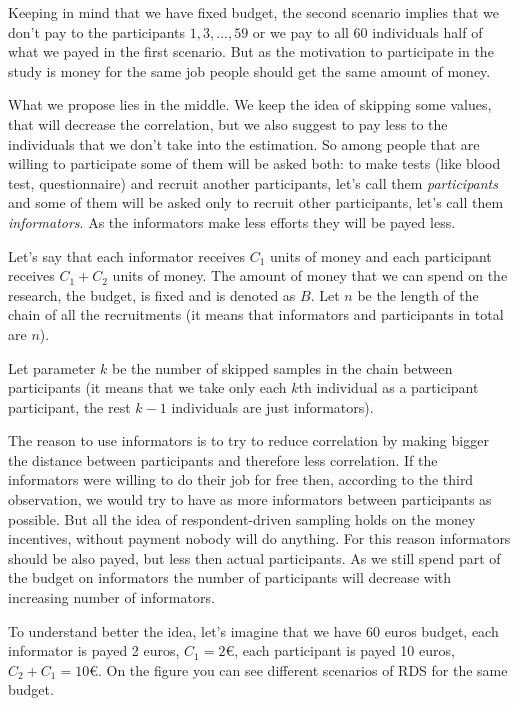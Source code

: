 \documentclass[12pt]{report}
\begin{document}
Keeping in mind that we have fixed budget, the second scenario implies that we don't pay to the participants $1, 3, ..., 59$ or we pay to all 60 individuals half of what we payed in the first scenario. But as the motivation to participate in the study is money for the same job people should get the same amount of money.

What we propose lies in the middle. We keep the idea of skipping some values, that will decrease the correlation, but we also suggest to pay less to the individuals that we don't take into the estimation. 
So among people that are willing to participate some of them will be asked both: to make tests (like blood test, questionnaire) and recruit another participants, let's call them \textit{participants} and some of them will be asked only to recruit other participants, let's call them \textit{informators}. As the informators make less efforts they will be payed less. 


Let's say that each informator receives $C_1$  units of money and each participant receives $C_1 + C_2$ units of money. The amount of money that we can spend on the research, the budget, is fixed and is denoted as $B$. 
Let $n$ be the length of the chain of all the recruitments (it means that informators and participants in total are $n$).

Let parameter $k$ be the number of skipped samples in the chain between participants (it means that we take only each $k$th individual as a participant participant, the rest $k-1$ individuals are just informators).

The reason to use informators is to try to reduce correlation by making bigger the distance between participants and therefore less correlation. If the informators were willing to do their job for free then, according to the third observation, we would try to have as more informators between participants as possible. But all the idea of respondent-driven sampling holds on the money incentives, without payment nobody will do anything. For this reason informators should be also payed, but less then actual participants. As we still spend part of the budget on informators the number of participants will decrease with increasing number of informators. 

To understand better the idea, let's imagine that we have 60 euros budget, each informator is payed 2 euros, $C_1 = 2$\euro, each participant is payed 10 euros, $C_2 + C_1 = 10$\euro. On the figure you can see different scenarios of RDS for the same budget. 
\end{document}
